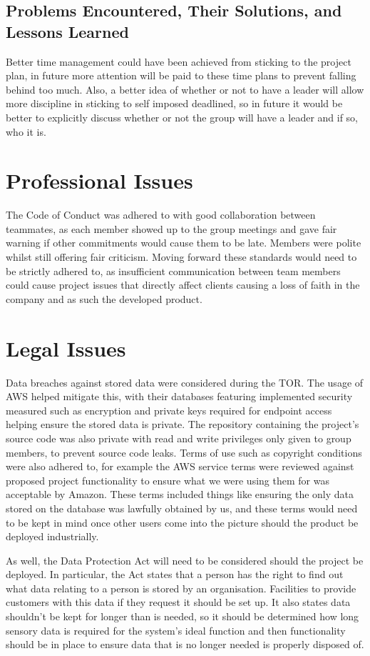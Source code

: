 \documentclass[]{report}
\begin{document}
	\subsection{Problems Encountered, Their Solutions, and Lessons Learned}
	Better time management could have been achieved from sticking to the project plan, in future more attention will be paid to these time plans to prevent falling behind too much. Also, a better idea of whether or not to have a leader will allow more discipline in sticking to self imposed deadlined, so in future it would be better to explicitly discuss whether or not the group will have a leader and if so, who it is.

\section{Professional Issues}
The Code of Conduct was adhered to with good collaboration between teammates, as each member showed up to the group meetings and gave fair warning if other commitments would cause them to be late. Members were polite whilst still offering fair criticism. Moving forward these standards would need to be strictly adhered to, as insufficient communication between team members could cause project issues that directly affect clients causing a loss of faith in the company and as such the developed product.

\section{Legal Issues}
Data breaches against stored data were considered during the TOR. The usage of AWS helped mitigate this, with their databases featuring implemented security measured\cite{awsdatabasedocs} such as encryption and private keys required for endpoint access helping ensure the stored data is private. The repository containing the project's source code was also private with read and write privileges only given to group members, to prevent source code leaks. Terms of use such as copyright conditions were also adhered to, for example the AWS service terms\cite{awsserviceterms} were reviewed against proposed project functionality to ensure what we were using them for was acceptable by Amazon. These terms included things like ensuring the only data stored on the database was lawfully obtained by us, and these terms would need to be kept in mind once other users come into the picture should the product be deployed industrially. 
\medskip

As well, the Data Protection Act\cite{dataprotectionact2018} will need to be considered should the project be deployed. In particular, the Act states that a person has the right to find out what data relating to a person is stored by an organisation. Facilities to provide customers with this data if they request it should be set up. It also states data shouldn't be kept for longer than is needed, so it should be determined how long sensory data is required for the system's ideal function and then functionality should be in place to ensure data that is no longer needed is properly disposed of. 
\end{document}
